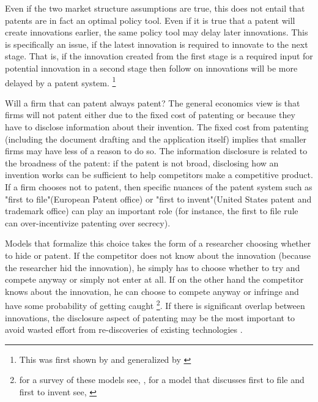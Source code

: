 \documentclass[12pt]{report}
\numberwithin{equation}{section}
\begin{document}
Even if the two market structure assumptions are true, this does not entail that patents are in fact an optimal policy tool. Even if it is true that a patent will create innovations earlier, the same policy tool may delay later innovations. This is specifically an issue, if the latest innovation is required to innovate to the next stage. That is, if the innovation created from the first stage is a required input for potential innovation in a second stage then follow on innovations will be more delayed by a patent system. \footnote{This was first shown by \cite{bessen_maskin} and generalized by \cite{Bryan2017}}

Will a firm that can patent always patent? The general economics view is that firms will not patent either due to the fixed cost of patenting or because they have to disclose information about their invention. The fixed cost from patenting (including the document drafting and the application itself) implies that smaller firms may have less of a reason to do so. The information disclosure is related to the broadness of the patent: if the patent is not broad, disclosing how an invention works can be sufficient to help competitors make a competitive product. If a firm chooses not to patent, then specific nuances of the patent system such as "first to file"(European Patent office) or "first to invent"(United States patent and trademark office) can play an important role (for instance, the first to file rule can over-incentivize patenting over secrecy).

Models that formalize this choice takes the form of a researcher choosing whether to hide or patent. If the competitor does not know about the innovation (because the researcher hid the innovation), he simply has to choose whether to try and compete anyway or simply not enter at all. If on the other hand the competitor knows about the innovation, he can choose to compete anyway or infringe and have some probability of getting caught \footnote{for a survey of these models see, \cite{Hall2014}, for a model that discusses first to file and first to invent see, \cite{Scotchmer1990} }. If there is significant overlap between innovations, the disclosure aspect of patenting may be the most important to avoid wasted effort from re-discoveries of existing technologies \citep{Kultti2007}.  

\end{document}
